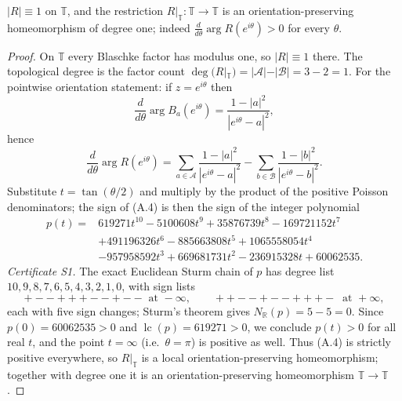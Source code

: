 \begin{lemma}\label{lem:circle-homeo}
\(|R|\equiv1\) on \(\mathbb T\), and the restriction \(R|_{\mathbb T}:\mathbb T\to\mathbb T\) is an orientation-preserving homeomorphism of degree one; indeed \(\frac{d}{d\theta}\arg R(e^{i\theta})>0\) for every \(\theta\).
\end{lemma}

\begin{proof}
On \(\mathbb T\) every Blaschke factor has modulus one, so \(|R|\equiv1\) there. The topological degree is the factor count \(\deg(R|_{\mathbb T})=|\mathcal A|-|\mathcal B|=3-2=1\).
For the pointwise orientation statement: if \(z=e^{i\theta}\) then
\[ \frac{d}{d\theta}\arg B_a(e^{i\theta})=\frac{1-|a|^2}{|e^{i\theta}-a|^2}, \]
hence
\[ \frac{d}{d\theta}\arg R(e^{i\theta})=\sum_{a\in\mathcal A}\frac{1-|a|^2}{|e^{i\theta}-a|^2}-\sum_{b\in\mathcal B}\frac{1-|b|^2}{|e^{i\theta}-b|^2}. \tag{A.4} \]
Substitute \(t=\tan(\theta/2)\) and multiply by the product of the positive Poisson denominators; the sign of (A.4) is then the sign of the integer polynomial
\[\begin{aligned} p(t)={}&619271t^{10}-5100608t^{9}+35876739t^{8}-169721152t^{7}\\ &+491196326t^{6}-885663808t^{5}+1065558054t^{4}\\ &-957958592t^{3}+669681731t^{2}-236915328t+60062535. \end{aligned}\tag{A.5}\]
\emph{Certificate S1.} The exact Euclidean Sturm chain of \(p\) has degree list \(10,9,8,7,6,5,4,3,2,1,0\), with sign lists
\[ +--+++--+--\ \text{ at } -\infty,\qquad ++--+--+++-\ \text{ at } +\infty, \]
each with five sign changes; Sturm's theorem gives \(N_{\mathbb R}(p)=5-5=0\). Since \(p(0)=60062535>0\) and \(\operatorname{lc}(p)=619271>0\), we conclude \(p(t)>0\) for all real \(t\), and the point \(t=\infty\) (i.e.\ \(\theta=\pi\)) is positive as well. Thus (A.4) is strictly positive everywhere, so \(R|_{\mathbb T}\) is a local orientation-preserving homeomorphism; together with degree one it is an orientation-preserving homeomorphism \(\mathbb T\to\mathbb T\).
\end{proof}